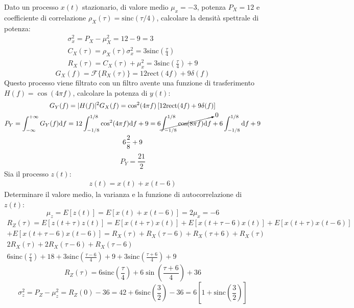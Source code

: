 \documentclass{article}
\newcommand{\rect}{\mathrm{rect}}
\newcommand{\sinc}{\mathrm{sinc}}
\newcommand{\df}{\mathrm{d}}
\begin{document}
Dato un processo $x(t)$ stazionario, di valore medio $\mu_x=-3$, potenza $P_X=12$ e coefficiente di correlazione $\rho_X(\tau)=\sinc(\tau/4)$, calcolare la densità spettrale 
di potenza:
\begin{gather*}
    \sigma_x^2=P_X-\mu_X^2=12-9=3\\
    C_X(\tau)=\rho_X(\tau)\sigma_x^2=3\sinc\displaystyle\left(\frac{\tau}{4}\right)\\
    R_X(\tau)=C_X(\tau)+\mu_x^2=3\sinc\displaystyle\left(\frac{\tau}{4}\right)+9
\end{gather*}
\begin{equation}
    G_X(f)=\mathscr{F}\{R_X(\tau)\}=12\rect(4f)+9\delta(f)
\end{equation}
Questo processo viene filtrato con un filtro avente una funzione di trasferimento $H(f)=\cos(4\pi f)$, calcolare la potenza 
di $y(t)$:
\begin{gather*}
    G_Y(f)=|H(f)|^2G_X(f)=\cos^2(4\pi f)\left[12\rect(4f)+9\delta(f)\right]\\
    P_Y=\displaystyle\int_{-\infty}^{+\infty}G_Y(f)\df f=12\int_{-1/8}^{1/8}\cos^2(4\pi f)\df f+9=6\cancelto{0}{\int_{-1/8}^{1/8}\cos(8\pi f)\df f}+6\int_{-1/8}^{1/8}\df f+9\\
    \displaystyle6\frac{2}{8}+9
\end{gather*}
\begin{equation}
    P_Y=\displaystyle\frac{21}{2}
\end{equation}
Sia il processo $z(t)$:
\begin{gather*}
    z(t)=x(t)+x(t-6)
\end{gather*}
Determinare il valore medio, la varianza e la funzione di autocorrelazione di $z(t)$:
\begin{equation}
    \mu_z=E[z(t)]=E[x(t)+x(t-6)]=2\mu_x=-6
\end{equation}
\begin{gather*}
    R_Z(\tau)=E[z(t+\tau)z(t)]=E[x(t+\tau)x(t)]+E[x(t+\tau-6)x(t)]+E[x(t+\tau)x(t-6)]\\
    +E[x(t+\tau-6)x(t-6)]=R_X(\tau)+R_X(\tau-6)+R_X(\tau+6)+R_X(\tau)\\
    2R_X(\tau)+2R_X(\tau-6)+R_X(\tau-6)\\
    6\sinc\displaystyle\left(\frac{\tau}{4}\right)+18+3\sinc\left(\frac{\tau-6}{4}\right)+9+3\sinc\left(\frac{\tau+6}{4}\right)+9
\end{gather*}
\begin{equation}
    R_Z(\tau)=6\sinc\left(\displaystyle\frac{\tau}{4}\right)+6\sin\left(\frac{\tau+6}{4}\right)+36
\end{equation}
\begin{equation}
    \sigma_z^2=P_Z-\mu_z^2=R_Z(0)-36=42+6\sinc\displaystyle\left(\frac{3}{2}\right)-36=6\left[1+\sinc\left(\frac{3}{2}\right)\right]
\end{equation}  
\end{document}
